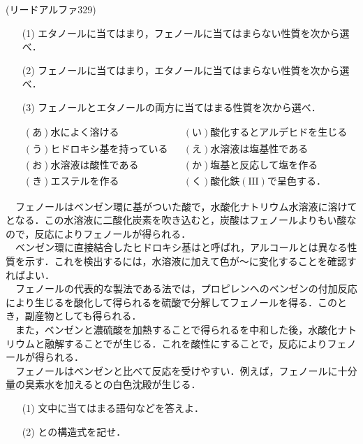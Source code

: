 \documentclass[a4paper,12pt]{ltjsreport}
\begin{document}
\begin{que}
(リードアルファ329)
\begin{itemize}
    \item [(1)]エタノールに当てはまり，フェノールに当てはまらない性質を次から選べ．
\item [(2)]フェノールに当てはまり，エタノールに当てはまらない性質を次から選べ．
\item [(3)]フェノールとエタノールの両方に当てはまる性質を次から選べ．
\end{itemize}
\begin{align*}
&(あ)水によく溶ける&&(い)酸化するとアルデヒドを生じる\\
&(う)ヒドロキシ基を持っている&&(え)水溶液は塩基性である\\
&(お)水溶液は酸性である&&(か)塩基と反応して塩を作る\\
&(き)エステルを作る&&(く)酸化鉄(\text{III})で呈色する．
\end{align*}
\end{que}
\ans 
\newpage
\begin{que} 　フェノールはベンゼン環に基がついた酸で，水酸化ナトリウム水溶液に溶けてとなる．この水溶液に二酸化炭素を吹き込むと，炭酸はフェノールよりもい酸なので，反応によりフェノールが得られる．\\
 　ベンゼン環に直接結合したヒドロキシ基はと呼ばれ，アルコールとは異なる性質を示す．これを検出するには，水溶液に加えて色が〜に変化することを確認すればよい．\\
 　フェノールの代表的な製法である法では，プロピレンへのベンゼンの付加反応により生じるを酸化して得られるを硫酸で分解してフェノールを得る．このとき，副産物としても得られる．\\
 　また，ベンゼンと濃硫酸を加熱することで得られるを中和した後，水酸化ナトリウムと融解することでが生じる．これを酸性にすることで，反応によりフェノールが得られる．\\
　フェノールはベンゼンと比べて反応を受けやすい．例えば，フェノールに十分量の臭素水を加えるとの白色沈殿が生じる．
 \begin{itemize}
    \item [(1)]文中に当てはまる語句などを答えよ．
    \item [(2)]との構造式を記せ．
 \end{itemize}
\end{que}
\end{document}
